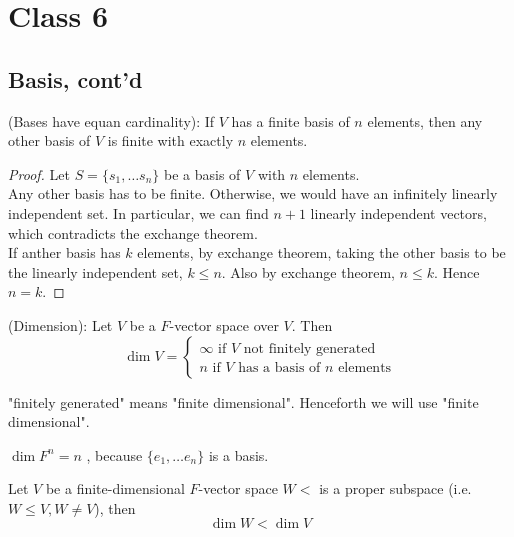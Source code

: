\section{Class 6}

\subsection{Basis, cont'd}

\begin{corollary}
(Bases have equan cardinality): If $V$ has a finite basis of $n$ elements, then any other basis of $V$ is finite with exactly $n$ elements. 
\end{corollary} 

\begin{proof}
Let $S = \{ s_1, \hdots s_n \} $ be a basis of $V$ with $n$ elements. \\

Any other basis has to be finite. Otherwise, we would have an infinitely linearly independent set. In particular, we can find $n + 1$ linearly independent vectors, which contradicts the exchange theorem. \\

If anther basis has $k$ elements, by exchange theorem, taking the other basis to be the linearly independent set, $k \leq n$. Also by exchange theorem, $n \leq k$. Hence $n = k$.
\end{proof}


\begin{definition}
(Dimension):  Let $V$ be a $F$-vector space over $V$. Then 
    \[
    \dim V = \begin{cases}
        \infty \text{ if $V$ not finitely generated} \\
        n \text{ if $V$ has a basis of $n$ elements}
    \end{cases}
    \]
\end{definition} 

\begin{remark}
"finitely generated" means "finite dimensional". Henceforth we will use "finite dimensional". \\
\end{remark}

\begin{remark}
 $\dim F^n = n$ , because $ \{ e_1, \hdots e_n \} $ is a basis. \\
\end{remark}


\begin{corollary}
Let $V$ be a finite-dimensional $F$-vector space $W < $ is a proper subspace (i.e. $W \leq V, W \neq V$), then 
    \[
      \dim W < \dim V
    \]
\end{corollary} 

